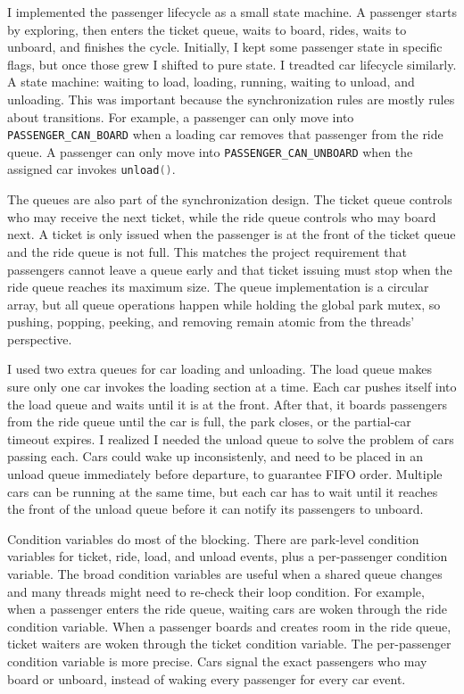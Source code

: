 \documentclass[12pt]{article}
\begin{document}
I implemented the passenger lifecycle as a small state machine. A passenger starts by exploring, then enters the ticket queue, waits to board, rides, waits to unboard, and finishes the cycle. Initially, I kept some passenger state in specific flags, but once those grew I shifted to pure state. I treadted car lifecycle similarly. A state machine: waiting to load, loading, running, waiting to unload, and unloading. This was important because the synchronization rules are mostly rules about transitions. For example, a passenger can only move into \lstinline[language=C]|PASSENGER_CAN_BOARD| when a loading car removes that passenger from the ride queue. A passenger can only move into \lstinline[language=C]|PASSENGER_CAN_UNBOARD| when the assigned car invokes \lstinline[language=C]|unload()|.

The queues are also part of the synchronization design. The ticket queue controls who may receive the next ticket, while the ride queue controls who may board next. A ticket is only issued when the passenger is at the front of the ticket queue and the ride queue is not full. This matches the project requirement that passengers cannot leave a queue early and that ticket issuing must stop when the ride queue reaches its maximum size. The queue implementation is a circular array, but all queue operations happen while holding the global park mutex, so pushing, popping, peeking, and removing remain atomic from the threads' perspective.

I used two extra queues for car loading and unloading. The load queue makes sure only one car invokes the loading section at a time. Each car pushes itself into the load queue and waits until it is at the front. After that, it boards passengers from the ride queue until the car is full, the park closes, or the partial-car timeout expires. I realized I needed the unload queue to solve the problem of cars passing each. Cars could wake up inconsistenly, and need to be placed in an unload queue immediately before departure, to guarantee FIFO order. Multiple cars can be running at the same time, but each car has to wait until it reaches the front of the unload queue before it can notify its passengers to unboard.

Condition variables do most of the blocking. There are park-level condition variables for ticket, ride, load, and unload events, plus a per-passenger condition variable. The broad condition variables are useful when a shared queue changes and many threads might need to re-check their loop condition. For example, when a passenger enters the ride queue, waiting cars are woken through the ride condition variable. When a passenger boards and creates room in the ride queue, ticket waiters are woken through the ticket condition variable. The per-passenger condition variable is more precise. Cars signal the exact passengers who may board or unboard, instead of waking every passenger for every car event.
\end{document}
